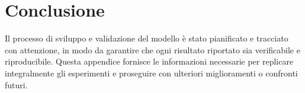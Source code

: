 \documentclass[11pt,a4paper]{report}
\begin{document}
\section{Conclusione}

Il processo di sviluppo e validazione del modello è stato pianificato e tracciato con attenzione, in modo da garantire che ogni risultato riportato sia verificabile e riproducibile.  
Questa appendice fornisce le informazioni necessarie per replicare integralmente gli esperimenti e proseguire con ulteriori miglioramenti o confronti futuri.
\end{document}
